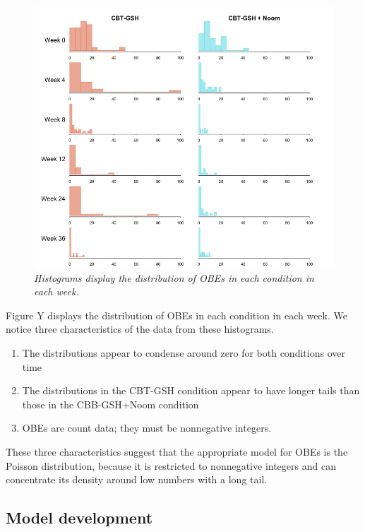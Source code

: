 \documentclass[12pt, oneside]{article}
\begin{document}
\begin{figure}
\centering
\includegraphics[width=\textwidth, height=\textheight, keepaspectratio]{noom_hist.png}
\caption{\emph{Histograms display the distribution of OBEs in each condition in each week.}}
\end{figure}

Figure Y displays the distribution of OBEs in each condition in each week.  We notice three characteristics of the data from these histograms.
\begin{enumerate}
\item{The distributions appear to condense around zero for both conditions over time} 
\item{The distributions in the CBT-GSH condition appear to have longer tails than those in the CBB-GSH+Noom condition}
\item{OBEs are count data; they must be nonnegative integers.}
\end{enumerate}
These three characteristics suggest that the appropriate model for OBEs is the Poisson distribution, because it is restricted to nonnegative integers and can concentrate its density around low numbers with a long tail.

\subsection{Model development}
\end{document}
